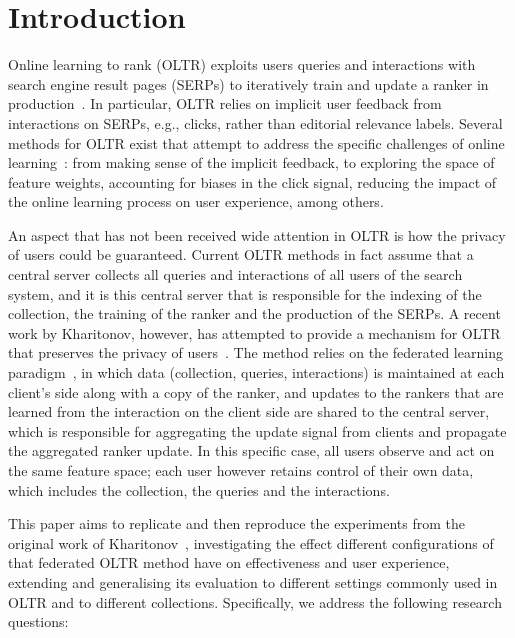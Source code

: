 \section{Introduction}

Online learning to rank (OLTR) exploits users queries and interactions with search engine result pages (SERPs) to iteratively train and update a ranker in  production~\cite{bibid}. In particular, OLTR relies on implicit user feedback from interactions on SERPs, e.g., clicks, rather than editorial relevance labels. 
Several methods for OLTR exist that attempt to address the specific challenges of online learning~\cite{bibid}: from making sense of the implicit feedback, to exploring the space of feature weights, accounting for biases in the click signal, reducing the impact of the online learning process on user experience, among others. 

An aspect that has not been received wide attention in OLTR is how the privacy of users could be guaranteed. Current OLTR methods in fact assume that a central server collects all queries and interactions of all users of the search system, and it is this central server that is responsible for the indexing of the collection, the training of the ranker and the production of the SERPs. A recent work by Kharitonov, however, has attempted to provide a mechanism for OLTR that preserves the privacy of users~\cite{kharitonov2019federated}. The method relies on the federated learning paradigm~\cite{bibid}, in which data (collection, queries, interactions) is maintained at each client's side along with a copy of the ranker, and updates to the rankers that are learned from the interaction on the client side are shared to the central server, which is responsible for aggregating the update signal from clients and propagate the aggregated ranker update. In this specific case, all users observe and act on the same feature space; each user however retains control of their own data, which includes the collection, the queries and the interactions.  


This paper aims to replicate and then reproduce the experiments from the original work of Kharitonov~\cite{kharitonov2019federated}, investigating the effect different configurations of that federated OLTR method have on effectiveness and user experience, extending and generalising its evaluation to different settings commonly used in OLTR and to different collections. Specifically, we address the following research questions:

